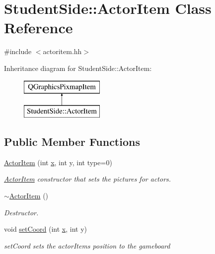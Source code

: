 \hypertarget{class_student_side_1_1_actor_item}{\section{Student\-Side\-:\-:Actor\-Item Class Reference}
\label{class_student_side_1_1_actor_item}
}


{\ttfamily \#include $<$actoritem.\-hh$>$}

Inheritance diagram for Student\-Side\-:\-:Actor\-Item\-:\begin{figure}[H]
\begin{center}
\leavevmode
\includegraphics[height=2.000000cm]{class_student_side_1_1_actor_item}
\end{center}
\end{figure}
\subsection*{Public Member Functions}
\begin{DoxyCompactItemize}
\item 
\hyperlink{class_student_side_1_1_actor_item_a741d8a8d3413683146380fa1311e7ffa}{Actor\-Item} (int \hyperlink{jquery_8js_a4c3eadaa5164016d2c340d495fc6e55e}{x}, int y, int type=0)
\begin{DoxyCompactList}\small\item\em \hyperlink{class_student_side_1_1_actor_item}{Actor\-Item} constructor that sets the pictures for actors. \end{DoxyCompactList}\item 
\hyperlink{class_student_side_1_1_actor_item_a089e14fc439cd834bd8aec50cd55be87}{$\sim$\-Actor\-Item} ()
\begin{DoxyCompactList}\small\item\em Destructor. \end{DoxyCompactList}\item 
void \hyperlink{class_student_side_1_1_actor_item_a5a2f0d7ad57b6a71f24112682e46c9a3}{set\-Coord} (int \hyperlink{jquery_8js_a4c3eadaa5164016d2c340d495fc6e55e}{x}, int y)
\begin{DoxyCompactList}\small\item\em set\-Coord sets the actor\-Items position to the gameboard \end{DoxyCompactList}\end{DoxyCompactItemize}


